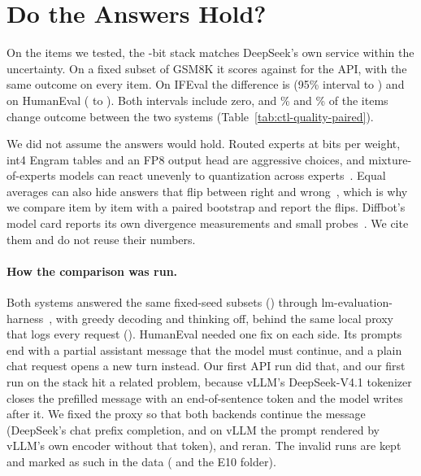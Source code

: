 \section{Do the Answers Hold?}\label{sec:quality}

On the items we tested, the -bit stack matches DeepSeek's own service within the uncertainty. On a
fixed subset of GSM8K it scores  against
 for the API, with the same outcome on every item. On IFEval the difference is
 (95\% interval  to ) and on HumanEval
 ( to ). Both
intervals include zero, and \% and \% of the items
change outcome between the two systems (Table~\ref{tab:ctl-quality-paired}).

We did not assume the answers would hold. Routed experts at  bits per weight, int4 Engram tables and an FP8 output head
are aggressive choices, and mixture-of-experts models can react unevenly to quantization across
experts~\citep{li2024quantmoebench}. Equal averages can also hide answers that flip between right and
wrong~\citep{dutta2024accuracy}, which is why we compare item by item with a paired bootstrap and report the flips.
Diffbot's model card reports its own divergence measurements and small probes~\citep{diffbot2026dsv41exl3}. We cite
them and do not reuse their numbers.

\paragraph{How the comparison was run.}
Both systems answered the same fixed-seed subsets () through
lm-evaluation-harness~\citep{sutawika2023lmeval}, with greedy decoding and thinking off, behind the same local proxy
that logs every request (). HumanEval needed one fix on each side. Its prompts end with
a partial assistant message that the model must continue, and a plain chat request opens a new turn instead. Our first
API run did that, and our first run on the stack hit a related problem, because vLLM's DeepSeek-V4.1 tokenizer closes
the prefilled message with an end-of-sentence token and the model writes after it. We fixed the proxy so that both
backends continue the message (DeepSeek's chat prefix completion, and on vLLM the prompt rendered by vLLM's own
encoder without that token), and reran. The invalid runs are kept and marked as such in the data
( and the E10 folder).

